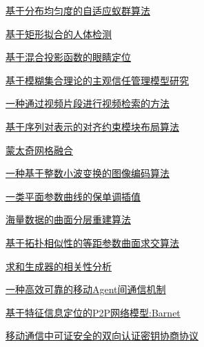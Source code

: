 \documentclass[a4paper]{article}
\begin{document}
\href{http://www.jos.org.cn/ch/reader/download_pdf.aspx?file_no=20030805&year_id=2003&quarter_id=8&falg=1}{基于分布均匀度的自适应蚁群算法}

\href{http://www.jos.org.cn/ch/reader/download_pdf.aspx?file_no=20030806&year_id=2003&quarter_id=8&falg=1}{基于矩形拟合的人体检测}

\href{http://www.jos.org.cn/ch/reader/download_pdf.aspx?file_no=20030807&year_id=2003&quarter_id=8&falg=1}{基于混合投影函数的眼睛定位}

\href{http://www.jos.org.cn/ch/reader/download_pdf.aspx?file_no=20030808&year_id=2003&quarter_id=8&falg=1}{基于模糊集合理论的主观信任管理模型研究}

\href{http://www.jos.org.cn/ch/reader/download_pdf.aspx?file_no=20030809&year_id=2003&quarter_id=8&falg=1}{一种通过视频片段进行视频检索的方法}

\href{http://www.jos.org.cn/ch/reader/download_pdf.aspx?file_no=20030810&year_id=2003&quarter_id=8&falg=1}{基于序列对表示的对齐约束模块布局算法}

\href{http://www.jos.org.cn/ch/reader/download_pdf.aspx?file_no=20030811&year_id=2003&quarter_id=8&falg=1}{蒙太奇网格融合}

\href{http://www.jos.org.cn/ch/reader/download_pdf.aspx?file_no=20030812&year_id=2003&quarter_id=8&falg=1}{一种基于整数小波变换的图像编码算法}

\href{http://www.jos.org.cn/ch/reader/download_pdf.aspx?file_no=20030813&year_id=2003&quarter_id=8&falg=1}{一类平面参数曲线的保单调插值}

\href{http://www.jos.org.cn/ch/reader/download_pdf.aspx?file_no=20030814&year_id=2003&quarter_id=8&falg=1}{海量数据的曲面分层重建算法}

\href{http://www.jos.org.cn/ch/reader/download_pdf.aspx?file_no=20030815&year_id=2003&quarter_id=8&falg=1}{基于拓扑相似性的等距参数曲面求交算法}

\href{http://www.jos.org.cn/ch/reader/download_pdf.aspx?file_no=20030816&year_id=2003&quarter_id=8&falg=1}{求和生成器的相关性分析}

\href{http://www.jos.org.cn/ch/reader/download_pdf.aspx?file_no=20030817&year_id=2003&quarter_id=8&falg=1}{一种高效可靠的移动Agent间通信机制}

\href{http://www.jos.org.cn/ch/reader/download_pdf.aspx?file_no=20030818&year_id=2003&quarter_id=8&falg=1}{基于特征信息定位的P2P网络模型:Barnet}

\href{http://www.jos.org.cn/ch/reader/download_pdf.aspx?file_no=20030819&year_id=2003&quarter_id=8&falg=1}{移动通信中可证安全的双向认证密钥协商协议}
\end{document}
